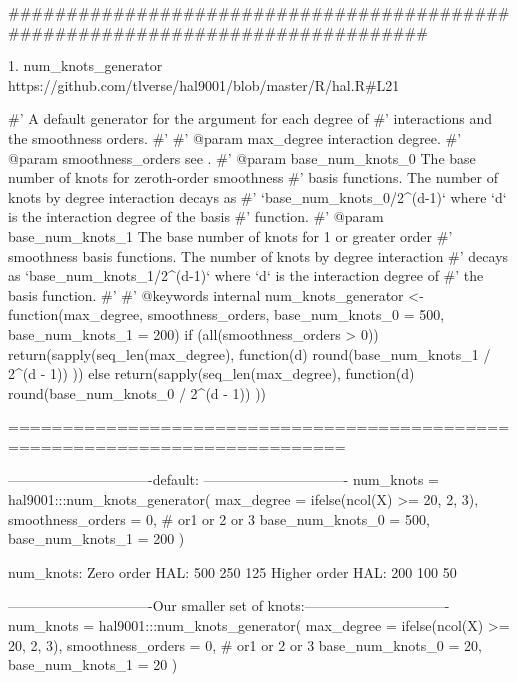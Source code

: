 


###############################################################################

1. num_knots_generator
https://github.com/tlverse/hal9001/blob/master/R/hal.R#L21 

#' A default generator for the  argument for each degree of
#' interactions and the smoothness orders.
#'
#' @param max_degree interaction degree.
#' @param smoothness_orders see .
#' @param base_num_knots_0 The base number of knots for zeroth-order smoothness
#'  basis functions. The number of knots by degree interaction decays as
#'  `base_num_knots_0/2^(d-1)` where `d` is the interaction degree of the basis
#'  function.
#' @param base_num_knots_1 The base number of knots for 1 or greater order
#'  smoothness basis functions. The number of knots by degree interaction
#'  decays as `base_num_knots_1/2^(d-1)` where `d` is the interaction degree of
#'  the basis function.
#'
#' @keywords internal
num_knots_generator <- function(max_degree, smoothness_orders, base_num_knots_0 = 500,
                                base_num_knots_1 = 200) {
  if (all(smoothness_orders > 0)) {
    return(sapply(seq_len(max_degree), function(d) {
      round(base_num_knots_1 / 2^(d - 1))
    }))
  } else {
    return(sapply(seq_len(max_degree), function(d) {
      round(base_num_knots_0 / 2^(d - 1))
    }))
  }
}


=============================================================================

-------------------------------default: -------------------------------
num_knots = hal9001:::num_knots_generator(
                                              max_degree = ifelse(ncol(X) >= 20, 2, 3), 
                                              smoothness_orders = 0, # or1 or 2 or 3 
                                              base_num_knots_0 = 500,
                                              base_num_knots_1 = 200  
                                            )

num_knots: 
	Zero order HAL: 
		500 250 125
	Higher order HAL:
		200 100  50
	

-------------------------------Our smaller set of knots:-------------------------------
num_knots = hal9001:::num_knots_generator(
                                              max_degree = ifelse(ncol(X) >= 20, 2, 3), 
                                              smoothness_orders = 0, # or1 or 2 or 3 
                                              base_num_knots_0 = 20,
                                              base_num_knots_1 = 20  
                                            )

